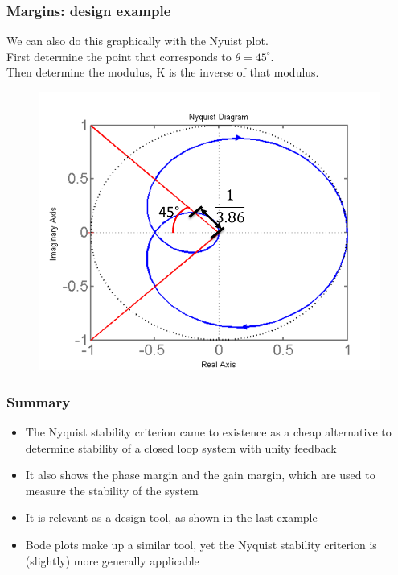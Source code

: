 \begin{frame}
	\frametitle{Margins: design example}
	We can also do this graphically with the Nyuist plot.\\
	\medskip
	First determine the point that corresponds to $\theta = 45^{\circ}$.\\
	Then determine the modulus, K is the inverse of that modulus.
	\vspace{-2ex}
	\begin{figure}
		\includegraphics[width=0.6\linewidth]{design_example}
	\end{figure}
\end{frame}

\begin{frame}
	\frametitle{Summary}
	\vspace{-6ex}
	\begin{itemize}
		\item The Nyquist stability criterion came to existence as a cheap alternative to determine stability of a closed loop system with unity feedback
		\item It also shows the phase margin and the gain margin, which are used to measure the stability of the system
		\item It is relevant as a design tool, as shown in the last example
		\item Bode plots make up a similar tool, yet the Nyquist stability criterion is (slightly) more generally applicable
	\end{itemize}
\end{frame}
